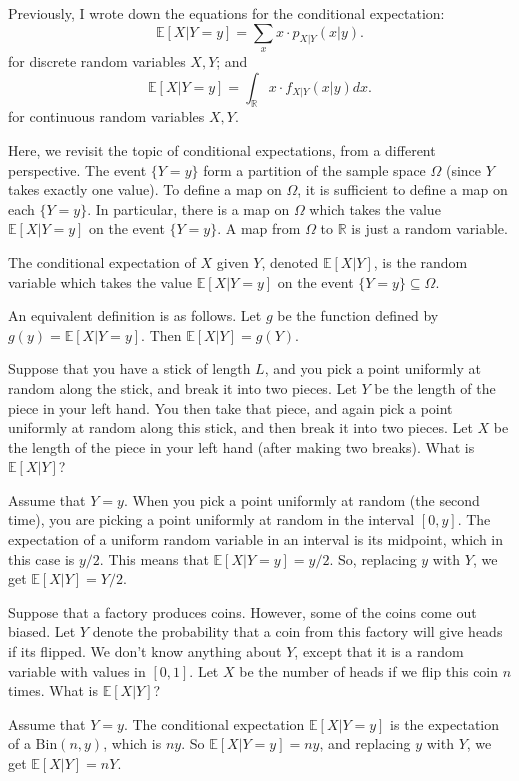 \documentclass{ximera}
\begin{document}
Previously, I wrote down the equations for the conditional expectation:
$$
\mathbb{E}[X \vert Y=y] = \sum_x x \cdot p_{X \vert Y}(x \vert y).
$$
for discrete random variables $X,Y$; and
$$
\mathbb{E}[X \vert Y=y] = \int_{\mathbb{R}} x \cdot f_{X \vert Y}(x \vert y) dx.
$$
for continuous random variables $X,Y$.

Here, we revisit the topic of conditional expectations, from a different perspective. The event $\{Y=y\}$ form a partition of the sample space $\Omega$ (since $Y$ takes exactly one value). To define a map on $\Omega$, it is sufficient to define a map on each $\{Y=y\}$. In particular, there is a map on $\Omega$ which takes the value $\mathbb{E}[X \vert Y= y]$ on the event $\{Y=y\}$. A map from $\Omega$ to $\mathbb{R}$ is just a random variable. 

\begin{definition}
The conditional expectation of $X$ given $Y$, denoted $\mathbb{E}[X \vert Y]$, is the random variable which takes the value $\mathbb{E}[X \vert Y=y]$ on the event $\{Y=y\} \subseteq \Omega$.

An equivalent definition is as follows. Let $g$ be the function defined by $g(y) = \mathbb{E}[X \vert Y=y]$. Then $\mathbb{E}[X \vert Y] = g(Y)$.
\end{definition}

\begin{example}
Suppose that you have a stick of length $L$, and you pick a point uniformly at random along the stick, and break it into two pieces. Let $Y$ be the length of the piece in your left hand. You then take that piece, and again pick a point uniformly at random along this stick, and then break it into two pieces. Let $X$ be the length of the piece in your left hand (after making two breaks). What is $\mathbb{E}[X \vert Y]$?

Assume that $Y=y$. When you pick a point uniformly at random (the second time), you are picking a point uniformly at random in the interval $[0,y]$. The expectation of a uniform random variable in an interval is its midpoint, which in this case is $y/2$. This means that $\mathbb{E}[X \vert Y=y]=y/2$. So, replacing $y$ with $Y$, we get $\mathbb{E}[X \vert Y]=Y/2$.
\end{example}

\begin{example}
Suppose that a factory produces coins. However, some of the coins come out biased. Let $Y$ denote the probability that a coin from this factory will give heads if its flipped. We don't know anything about $Y$, except that it is a random variable with values in $[0,1]$. Let $X$ be the number of heads if we flip this coin $n$ times. What is $\mathbb{E}[X\vert Y]$? 

Assume that $Y=y.$ The conditional expectation $\mathbb{E}[X \vert Y=y]$ is the expectation of a $\textrm{Bin}(n,y)$, which is $ny$. So $\mathbb{E}[X \vert Y=y]=ny$, and replacing $y$ with $Y$, we get $\mathbb{E}[X \vert Y] = nY$.
\end{example}
\end{document}
